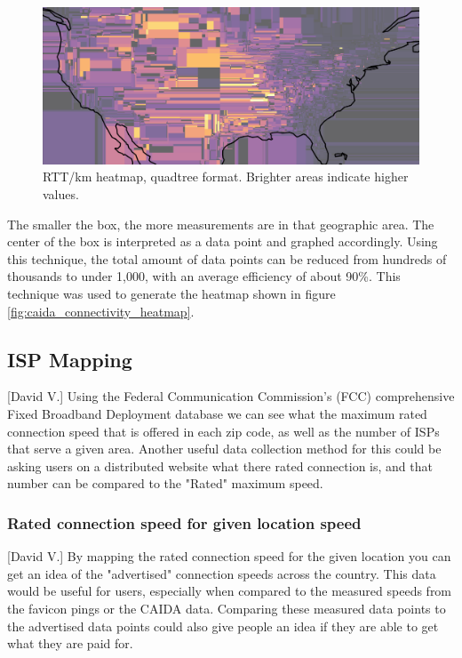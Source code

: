 \documentclass[12pt]{article}
\begin{document}
\begin{figure}[H]
    \centering
    \includegraphics[width=\textwidth]{images/caida_connect_quadplot.png}
    \caption{RTT/km heatmap, quadtree format. Brighter areas indicate higher values.}
    \label{fig:caida_quadplot}
\end{figure}

The smaller the box, the more measurements are in that geographic area. The center of the box is interpreted as a data point and graphed accordingly. Using this technique, the total amount of data points can be reduced from hundreds of thousands to under 1,000, with an average efficiency of about 90\%. This technique was used to generate the heatmap shown in figure \ref{fig:caida_connectivity_heatmap}.

\subsection{ISP Mapping}[David V.]
Using the Federal Communication Commission's (FCC) comprehensive Fixed Broadband Deployment database \cite{FixedMap} we can see what the maximum rated connection speed that is offered in each zip code, as well as the number of ISPs that serve a given area. Another useful data collection method  for this could be asking users on a distributed website what there rated connection is, and that number can be compared to the "Rated" maximum speed. 

\subsubsection{Rated connection speed for given location speed}[David V.]
By mapping the rated connection speed for the given location you can get an idea of the "advertised" connection speeds across the country. This data would be useful for users, especially when compared to the measured speeds from the favicon pings or the CAIDA data. Comparing these measured data points to the advertised data points could also give people an idea if they are able to get what they are paid for.  
\end{document}
